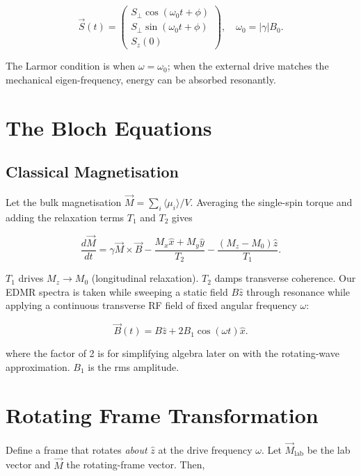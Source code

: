 \documentclass[svgnames]{article}
\begin{document}
\[
\vec{S}(t) = \begin{pmatrix}
    S_\perp \cos(\omega_0 t + \phi) \\ S_\perp \sin(\omega_0 t + \phi) \\ S_z(0)
\end{pmatrix} , \quad \omega_0 = |\gamma| B_0.
\] \vspace{3px}

The Larmor condition is when $\omega = \omega_0$; when the external drive
matches the mechanical eigen-frequency, energy can be absorbed resonantly. 

\section{The Bloch Equations} 

\subsection{Classical Magnetisation}

Let the bulk magnetisation $\vec{M} = \sum_i \langle \mu_i \rangle / V$.
Averaging the single-spin torque and adding the relaxation terms $T_1$ and $T_2$
gives 

\[
    \frac{d \vec{M}}{d t} = \gamma \vec{M} \times \vec{B} - \frac{M_x \hat{x} +
    M_y \hat{y}}{T_2} - \frac{(M_z - M_0)\hat{z}}{T_1}. 
\] \vspace{3px}

$T_1$ drives $M_z \rightarrow M_0$ (longitudinal relaxation). $T_2$ damps
transverse coherence. Our EDMR spectra is taken while sweeping a static field
$B \hat{z}$ through resonance while applying a continuous transverse RF field of
fixed angular frequency $\omega$: 

\[
\vec{B}(t) = B \hat{z} + 2B_1 \cos(\omega t) \hat{x}. 
\] \vspace{3px}

where the factor of 2 is for simplifying algebra later on with the rotating-wave
approximation. $B_1$ is the rms amplitude. 

\section{Rotating Frame Transformation}

Define a frame that rotates \textit{about} $\hat{z}$ at the drive frequency
$\omega$. Let $\vec{M}_\text{lab} $ be the lab vector and $\vec{M}$ the
rotating-frame vector. Then, 
\end{document}

